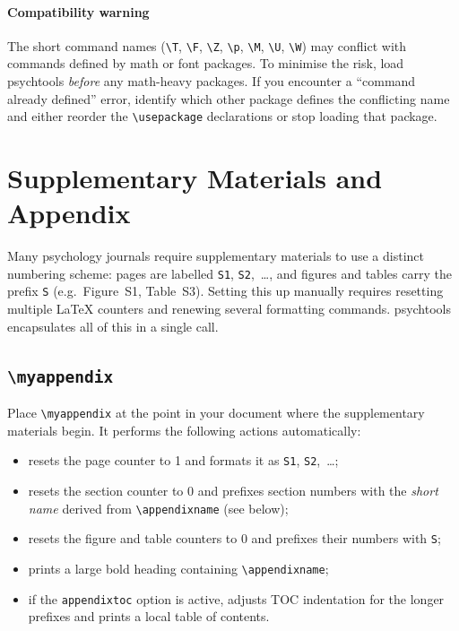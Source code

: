 \documentclass[a4paper,11pt]{article}
\makeatletter
\newcommand{\pkg}[1]{\textsf{#1}}
\newcommand{\cmd}[1]{\texttt{\textbackslash #1}}
\newcommand{\opt}[1]{\texttt{#1}}
\newcommand{\icmd}[1]{\cmd{#1}\index{#1@\texttt{\textbackslash #1}}}
\makeatother
\begin{document}
\paragraph{Compatibility warning}
\label{sec:compat}
The short command names (\cmd{T}, \cmd{F}, \cmd{Z}, \cmd{p}, \cmd{M},
\cmd{U}, \cmd{W}) may conflict with commands defined by math or font
packages. To minimise the risk, load \pkg{psychtools} \emph{before}
any math-heavy packages. If you encounter a ``command already defined''
error, identify which other package defines the conflicting name and
either reorder the \cmd{usepackage} declarations or stop loading that
package.

\section{Supplementary Materials and Appendix}
\label{sec:appendix}

Many psychology journals require supplementary materials to use a
distinct numbering scheme: pages are labelled \texttt{S1},
\texttt{S2},~\ldots, and figures and tables carry the prefix
\texttt{S} (e.g.\ Figure~S1, Table~S3).  Setting this up manually
requires resetting multiple \LaTeX{} counters and renewing several
formatting commands.  \pkg{psychtools} encapsulates all of this in a
single call.

\subsection{\icmd{myappendix}}

Place \cmd{myappendix} at the point in your document where the
supplementary materials begin. It performs the following actions
automatically:

\begin{itemize}
  \item resets the page counter to 1 and formats it as \texttt{S1},
        \texttt{S2},~\ldots;
  \item resets the section counter to 0 and prefixes section numbers
        with the \emph{short name} derived from \cmd{appendixname}
        (see below);
  \item resets the figure and table counters to 0 and prefixes their
        numbers with \texttt{S};
  \item prints a large bold heading containing \cmd{appendixname};
  \item if the \opt{appendixtoc} option is active, adjusts TOC
        indentation for the longer prefixes and prints a local table
        of contents.
\end{itemize}
\end{document}
